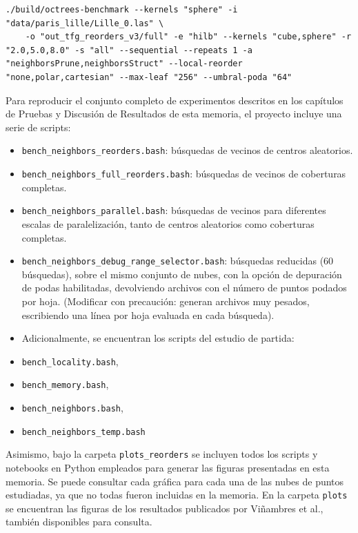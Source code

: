 \begin{verbatim}
./build/octrees-benchmark --kernels "sphere" -i "data/paris_lille/Lille_0.las" \
    -o "out_tfg_reorders_v3/full" -e "hilb" --kernels "cube,sphere" -r "2.0,5.0,8.0" -s "all" --sequential --repeats 1 -a "neighborsPrune,neighborsStruct" --local-reorder "none,polar,cartesian" --max-leaf "256" --umbral-poda "64"
\end{verbatim}

Para reproducir el conjunto completo de experimentos descritos en los
capítulos de Pruebas y Discusión de Resultados de esta memoria, el
proyecto incluye una serie de scripts:

\begin{itemize}
    \item \texttt{bench\_neighbors\_reorders.bash}: búsquedas de vecinos de centros aleatorios.
    \item \texttt{bench\_neighbors\_full\_reorders.bash}: búsquedas de vecinos de coberturas completas.
    \item \texttt{bench\_neighbors\_parallel.bash}: búsquedas de vecinos para diferentes escalas de paralelización, tanto de centros aleatorios como coberturas completas.
    \item \texttt{bench\_neighbors\_debug\_range\_selector.bash}: búsquedas reducidas (60 búsquedas), sobre el mismo conjunto de nubes, con la opción de depuración de podas habilitadas, devolviendo archivos con el número de puntos podados por hoja. (Modificar con precaución: generan archivos muy pesados, escribiendo una línea por hoja evaluada en cada búsqueda).
    \item Adicionalmente, se encuentran los scripts del estudio de partida: \item \texttt{bench\_locality.bash}, \item \texttt{bench\_memory.bash}, \item \texttt{bench\_neighbors.bash}, \item \texttt{bench\_neighbors\_temp.bash}
\end{itemize}

Asimismo, bajo la carpeta \texttt{plots\_reorders} se incluyen todos los scripts y notebooks en Python empleados para generar las figuras presentadas en esta memoria. Se puede consultar cada gráfica para cada una de las nubes de puntos estudiadas, ya que no todas fueron incluidas en la memoria. En la carpeta \texttt{plots} se encuentran las figuras de los resultados publicados por Viñambres et al., también disponibles para consulta.



